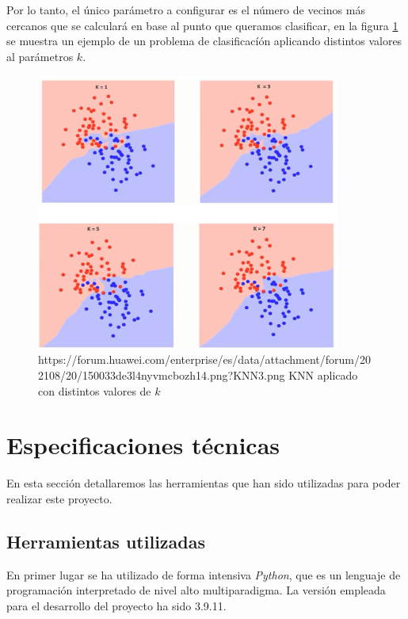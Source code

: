             Por lo tanto, el único parámetro a configurar es el número de vecinos más cercanos que se calculará en base al punto que queramos clasificar, en la figura \ref{KNNImage} se muestra un ejemplo de un problema de clasificacíón aplicando distintos valores al parámetros $k$.

            \begin{figure}[h]
                \centering
                \includegraphics[width=10cm]{archivos/CNN/KNN/KNNImage}
                \caption{https://forum.huawei.com/enterprise/es/data/attachment/forum/202108/20/150033de3l4nyvmcbozh14.png?KNN3.png KNN aplicado con distintos valores de $k$}
                \label{KNNImage}
            \end{figure}

            

    \section{Especificaciones técnicas}

        En esta sección detallaremos las herramientas que han sido utilizadas para poder realizar este proyecto.


        \subsection{Herramientas utilizadas}
            En primer lugar se ha utilizado de forma intensiva \textit{Python}, que es un lenguaje de programación interpretado de nivel alto multiparadigma. La versión empleada para el desarrollo del proyecto ha sido 3.9.11. \cite{Python}
            
